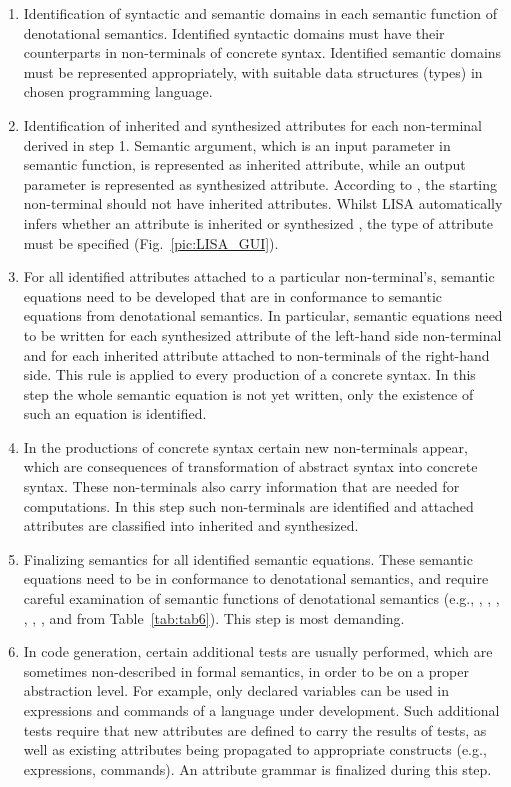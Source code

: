 \documentclass[preprint, prX]{revtex4}
\begin{document}
\begin{enumerate}
  \item Identification of syntactic and semantic domains in each semantic function of denotational semantics. Identified syntactic domains must have their counterparts in non-terminals of concrete syntax. Identified semantic domains must be represented appropriately, with suitable data structures (ty\-pes) in chosen programming language.
  \item Identification of inherited and synthesized attributes for each non-terminal derived in step 1. Semantic argument, which is an input parameter in semantic function, is represented as inherited attribute, while an output parameter is represented as synthesized attribute. According to \cite{Knuth:1968}, the starting non-terminal should not have inherited attributes. Whilst LISA automatically infers whether an attribute is inherited or synthesized \cite{Knuth:1968}, the type of attribute must be specified (Fig.~\ref{pic:LISA_GUI}).
  \item For all identified attributes attached to a particular non-terminal's, semantic equations need to be developed that are in conformance to semantic equations from denotational semantics. In particular, semantic equations need to be written for each synthesized attribute of the left-hand side non-terminal and for each inherited attribute attached to non-terminals of the right-hand side. This rule is applied to every production of a concrete syntax. In this step the whole semantic equation is not yet written, only the existence of such an equation is identified.
  \item In the productions of concrete syntax certain new non-terminals appear, which are consequences of transformation of abstract syntax into concrete syntax. These non-terminals also carry information that are needed for computations. In this step such non-terminals are identified and attached attributes are classified into inherited and synthesized.
  \item Finalizing semantics for all identified semantic equations. These semantic equations need to be in conformance to denotational semantics, and require careful examination of semantic functions of denotational semantics (e.g., , , , , ,
, and  from Table~\ref{tab:tab6}). This step is most demanding.
  \item In code generation, certain additional tests are usually performed, which are sometimes non-described in formal semantics, in order to be on a proper abstraction level. For example, only declared variables can be used in expressions and commands of a language under development. Such additional tests require that new attributes are defined to carry the results of tests, as well as existing attributes being propagated to appropriate constructs (e.g., expressions, commands). An attribute grammar is finalized during this step.
\end{enumerate}
\end{document}
